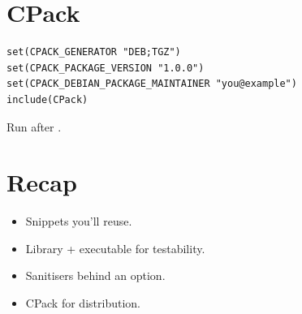 \section{CPack}

\begin{lstlisting}
set(CPACK_GENERATOR "DEB;TGZ")
set(CPACK_PACKAGE_VERSION "1.0.0")
set(CPACK_DEBIAN_PACKAGE_MAINTAINER "you@example")
include(CPack)
\end{lstlisting}

Run  after .

\section{Recap}

\begin{recap}
\begin{itemize}[leftmargin=*]
  \item Snippets you'll reuse.
  \item Library + executable for testability.
  \item Sanitisers behind an option.
  \item CPack for distribution.
\end{itemize}
\end{recap}
